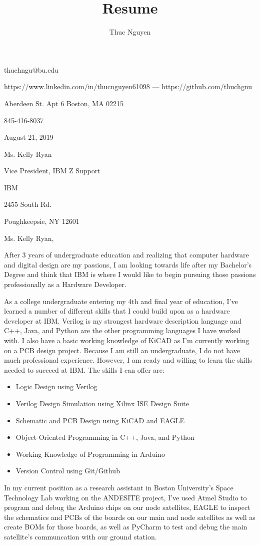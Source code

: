 \documentclass{article}
\makeatletter
\renewcommand{\maketitle}
{\begin{center}
{\huge\bfseries\theauthor}
\vspace{.5em}

thuchngu@bu.edu

https://www.linkedin.com/in/thucnguyen61098 --- https://github.com/thuchgnu

\end{center}}
\makeatother
\begin{document}
\title{Resume}
\author{Thuc Nguyen}
\maketitle
\vspace{-.5em}
{ Aberdeen St. Apt 6 Boston, MA 02215

845-416-8037

}

\vspace{2em}
August 21, 2019

\vspace{2em}

Ms. Kelly Ryan

Vice President, IBM Z Support

IBM

2455 South Rd.

Poughkeepsie, NY 12601
\vspace{2em}

Ms. Kelly Ryan,

\vspace{1em}
After 3 years of undergraduate education and realizing that computer hardware and digital design are my passions, I am looking towards life after my Bachelor's Degree and think that IBM is where I would like to begin pursuing those passions professionally as a Hardware Developer.

\vspace{1em}
As a college undergraduate entering my 4th and final year of education, I've learned a number of different skills that I could build upon as a hardware developer at IBM. Verilog is my strongest hardware description language and C++, Java, and Python are the other programming languages I have worked with. I also have a basic working knowledge of KiCAD as I'm currently working on a PCB design project. Because I am still an undergraduate, I do not have much professional experience. However, I am ready and willing to learn the skills needed to succeed at IBM. The skills I can offer are:

\begin{itemize}
  \item{Logic Design using Verilog}
  \item{Verilog Design Simulation using Xilinx ISE Design Suite}
  \item{Schematic and PCB Design using KiCAD and EAGLE}
  \item{Object-Oriented Programming in C++, Java, and Python}
  \item{Working Knowledge of Programming in Arduino}
  \item{Version Control using Git/Github}
\end{itemize}

\vspace{1em}
In my current position as a research assistant in Boston University's Space Technology Lab working on the ANDESITE project, I've used Atmel Studio to program and debug the Arduino chips on our node satellites, EAGLE to inspect the schematics and PCBs of the boards on our main and node satellites as well as create BOMs for those boards, as well as PyCharm to test and debug the main satellite's communcation with our ground station. 
\end{document}
